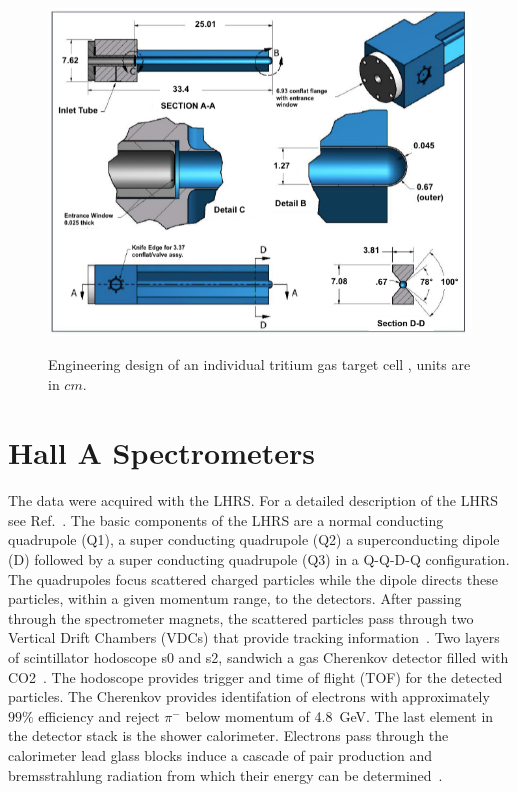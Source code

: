 \documentclass[review,numbers,sort&compress]{elsarticle}
\begin{document}
\begin{figure}[!h]
\centering
  \includegraphics[width=13cm]{images/tritium_cell.jpg}\\
  \caption{Engineering design of an individual tritium gas target cell \cite{celldes}, units are in $cm$.
 }\label{cell}
\end{figure}


\section{Hall A Spectrometers}

The data were acquired with the LHRS. For a detailed description of the LHRS see Ref.~\cite{Alcorn:2004sb}. The basic components of the LHRS 
are a normal conducting quadrupole (Q1), a super conducting quadrupole (Q2) a superconducting dipole (D) followed by a super conducting 
quadrupole (Q3) in a Q-Q-D-Q configuration. The quadrupoles focus scattered charged particles while the dipole directs these particles, 
within a given momentum range, to the detectors. After passing through the spectrometer magnets, the scattered particles pass through 
two Vertical Drift Chambers (VDCs) that provide tracking information~\cite{Fissum:2001st}. 
Two layers of scintillator hodoscope s0 and s2, sandwich a gas 
Cherenkov detector filled with CO2~\cite{Iodice:1998ft}.  The hodoscope provides trigger and time of flight (TOF) for the detected particles.  
The Cherenkov provides identifation of electrons with approximately $99\%$ efficiency and reject $\pi^{-}$ below momentum of 4.8~GeV.  
The last element in the detector stack is the shower calorimeter. Electrons pass through the calorimeter lead glass blocks 
induce a cascade of pair production and bremsstrahlung radiation from which their energy can be determined~\cite{Alcorn:2004sb}.
\end{document}
